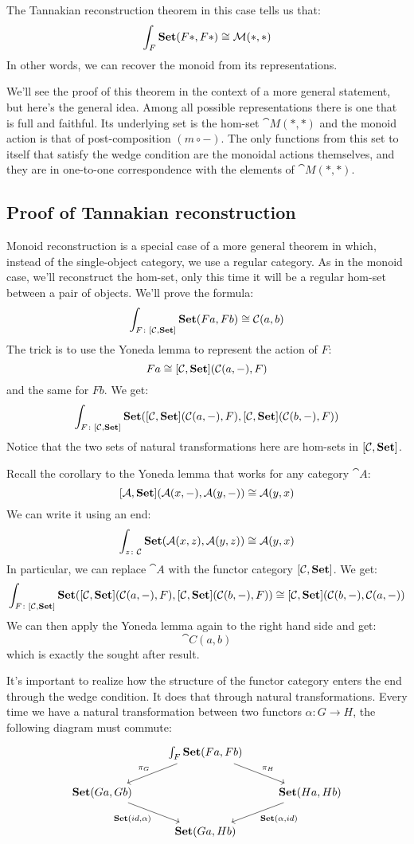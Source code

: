 \documentclass[DaoFP]{subfiles}
\begin{document}
The Tannakian reconstruction theorem in this case tells us that:
\[ \int_F \mathbf{Set}(F *, F *) \cong \mathcal{M} (*, *) \]
In other words, we can recover the monoid from its representations. 

We'll see the proof of this theorem in the context of a more general statement, but here's the general idea. Among all possible representations there is one that is full and faithful. Its underlying set is the hom-set $\cat M (*, *)$ and the monoid action is that of post-composition $(m \circ -)$. The only functions from this set to itself that satisfy the wedge condition are the monoidal actions themselves, and they are in one-to-one correspondence with the elements of $\cat M (*, *)$.


\subsection{Proof of Tannakian reconstruction}

Monoid reconstruction is a special case of a more general theorem in which, instead of the single-object category, we use a regular category. As in the monoid case, we'll reconstruct the hom-set, only this time it will be a regular hom-set between a pair of objects. We'll prove the formula:
\[ \int_{F \colon [\mathcal{C}, \mathbf{Set}]} \mathbf{Set} (F a, F b) \cong \mathcal{C}(a, b) \]
The trick is to use the Yoneda lemma to represent the action of $F$:
\[ F a \cong [\mathcal{C}, \mathbf{Set}] ( \mathcal{C} (a ,-), F) \]
and the same for $F b$. We get:
\[ \int_{F \colon [\mathcal{C}, \mathbf{Set}]} \mathbf{Set} ([\mathcal{C}, \mathbf{Set}] ( \mathcal{C} (a ,-), F), [\mathcal{C}, \mathbf{Set}] ( \mathcal{C} (b ,-), F)) \]
Notice that the two sets of natural transformations here are hom-sets in $[\mathcal{C}, \mathbf{Set}]$. 

Recall the corollary to the Yoneda lemma that works for any category $\cat A$:
\[ [\mathcal{A}, \mathbf{Set}] (\mathcal{A} (x, -), \mathcal{A} (y, -)) \cong \mathcal{A} (y, x) \]
We can write it using an end:
\[ \int_{z \colon \mathcal{C}} \mathbf{Set} (\mathcal{A} (x, z), \mathcal{A} (y, z)) \cong \mathcal{A} (y, x) \]
In particular, we can replace $\cat A$ with the functor category $[\mathcal{C}, \mathbf{Set}]$. We get:
\[ \int_{F \colon [\mathcal{C}, \mathbf{Set}]} \mathbf{Set} ([\mathcal{C}, \mathbf{Set}] ( \mathcal{C} (a ,-), F), [\mathcal{C}, \mathbf{Set}] ( \mathcal{C} (b ,-), F)) \cong [\mathcal{C}, \mathbf{Set}](\mathcal{C} (b ,-), \mathcal{C} (a ,-))\]
We can then apply the Yoneda lemma again to the right hand side and get:
\[ \cat C (a, b) \]
which is exactly the sought after result.

It's important to realize how the structure of the functor category enters the end through the wedge condition. It does that through natural transformations. Every time we have a natural transformation between two functors $\alpha \colon G \to H$, the following diagram must commute:
\[
 \begin{tikzcd}
 & \int_F \Set (F a, F b)
 \arrow[dl, "\pi_G"']
 \arrow[dr, "\pi_H"]
 \\
 \Set(G a, G b)
 \arrow[dr, "{\Set(id, \alpha)}"']
 && \Set (H a, H b)
  \arrow[dl, "{\Set (\alpha, id)}"]
\\
 & \Set (G a, H b)
 \end{tikzcd}
\]
\end{document}
